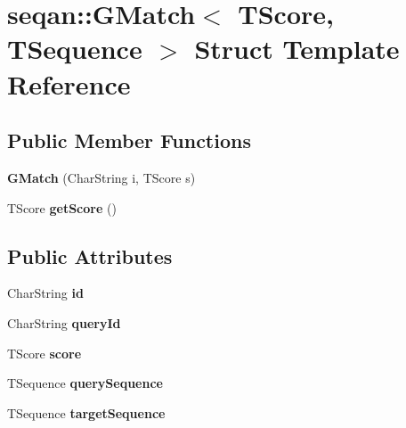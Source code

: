 \hypertarget{structseqan_1_1_g_match}{\section{seqan\-:\-:\-G\-Match$<$ \-T\-Score, \-T\-Sequence $>$ \-Struct \-Template \-Reference}
\label{structseqan_1_1_g_match}
}
\subsection*{\-Public \-Member \-Functions}
\begin{DoxyCompactItemize}
\item 
\hypertarget{structseqan_1_1_g_match_a2d9ca43c6774fc0a6ecce18a1616cee5}{{\bfseries \-G\-Match} (\-Char\-String i, \-T\-Score s)}\label{structseqan_1_1_g_match_a2d9ca43c6774fc0a6ecce18a1616cee5}

\item 
\hypertarget{structseqan_1_1_g_match_abb18449ea53a23e2d2b00d0ca60e2ad5}{\-T\-Score {\bfseries get\-Score} ()}\label{structseqan_1_1_g_match_abb18449ea53a23e2d2b00d0ca60e2ad5}

\end{DoxyCompactItemize}
\subsection*{\-Public \-Attributes}
\begin{DoxyCompactItemize}
\item 
\hypertarget{structseqan_1_1_g_match_ae4eac560a806ad0771f1aea4106ffd0d}{\-Char\-String {\bfseries id}}\label{structseqan_1_1_g_match_ae4eac560a806ad0771f1aea4106ffd0d}

\item 
\hypertarget{structseqan_1_1_g_match_a49524158acebda7f2aa2711fa675fe5a}{\-Char\-String {\bfseries query\-Id}}\label{structseqan_1_1_g_match_a49524158acebda7f2aa2711fa675fe5a}

\item 
\hypertarget{structseqan_1_1_g_match_a167782c90ebf893b4ed14dec10751e2d}{\-T\-Score {\bfseries score}}\label{structseqan_1_1_g_match_a167782c90ebf893b4ed14dec10751e2d}

\item 
\hypertarget{structseqan_1_1_g_match_a5bf1edefeece4584350a5d8b51bf5931}{\-T\-Sequence {\bfseries query\-Sequence}}\label{structseqan_1_1_g_match_a5bf1edefeece4584350a5d8b51bf5931}

\item 
\hypertarget{structseqan_1_1_g_match_a13f2c3906e402472217935df02c0c134}{\-T\-Sequence {\bfseries target\-Sequence}}\label{structseqan_1_1_g_match_a13f2c3906e402472217935df02c0c134}

\end{DoxyCompactItemize}
